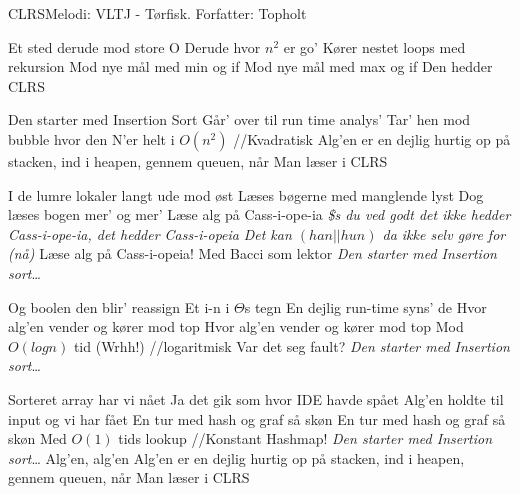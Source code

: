 \begin{sang}{CLRS}{Melodi: VLTJ - Tørfisk. Forfatter: Topholt}
    \begin{vers}
    Et sted derude mod store O
    Derude hvor $n^2$ er go'
    Kører nestet loops med rekursion
    Mod nye mål med min og if
    Mod nye mål med max og if
    Den hedder CLRS
    \end{vers}
    
    \begin{omkvaed}
    Den starter med Insertion Sort
    Går' over til run time analys'
    Tar' hen mod bubble hvor den N'er helt i $O(n^2)$ //Kvadratisk
    Alg'en er en dejlig hurtig op på stacken, ind i heapen, gennem queuen, når
    Man læser i CLRS
    \end{omkvaed}
    
    \begin{vers}
    I de lumre lokaler langt ude mod øst
    Læses bøgerne med manglende lyst
    Dog læses bogen mer' og mer'
    Læse alg på Cass-i-ope-ia
    \textit{\$s du ved godt det ikke hedder Cass-i-ope-ia, det hedder Cass-i-opeia}
    \textit{Det kan $(han||hun)$ da ikke selv gøre for (nå)}
    Læse alg på Cass-i-opeia!
    Med Bacci som lektor
    \emph{Den starter med Insertion sort}\ldots
    \end{vers}
    
    \begin{vers}
    Og boolen den blir' reassign
    Et i-n i $\Theta$s tegn
    En dejlig run-time syns' de
    Hvor alg'en vender og kører mod top
    Hvor alg'en vender og kører mod top
    Mod $O(log n)$ tid (Wrhh!) //logaritmisk
    Var det seg fault?
    \emph{Den starter med Insertion sort}\ldots
    \end{vers}

    \begin{vers}
    Sorteret array har vi nået
    Ja det gik som hvor IDE havde spået
    Alg'en holdte til input og vi har fået
    En tur med hash og graf så skøn
    En tur med hash og graf så skøn
    Med $O(1)$ tids lookup //Konstant
    Hashmap!
    \emph{Den starter med Insertion sort}\ldots
    Alg'en, alg'en
    Alg'en er en dejlig hurtig op på stacken, ind i heapen, gennem queuen, når
    Man læser i CLRS
    \end{vers}
\end{sang}